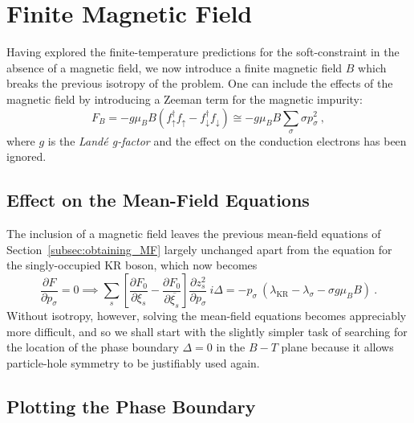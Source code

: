 
\section{Finite Magnetic Field}
\label{sec:finite_field}

Having explored the finite-temperature predictions for the soft-constraint in the absence of a magnetic field, we now introduce a finite magnetic field $ B $ which breaks the previous isotropy of the problem. One can include the effects of the magnetic field by introducing a Zeeman term for the magnetic impurity: $$ F_{B} = - g \mu_{B} B \left( f^{\dagger}_{\uparrow} f^{}_{\uparrow} - f^{\dagger}_{\downarrow} f^{}_{\downarrow} \right) \cong - g \mu_{B} B \sum_{\sigma} \sigma p^2_{\sigma} ~ , $$ where $ g $ is the \textit{Land\'{e} g-factor} and the effect on the conduction electrons has been ignored.

\subsection{Effect on the Mean-Field Equations}

The inclusion of a magnetic field leaves the previous mean-field equations of Section~\ref{subsec:obtaining_MF} largely unchanged apart from the equation for the singly-occupied KR boson, which now becomes
\begin{equation}
\frac{\partial F}{\partial p_{\sigma}} = 0 \implies \sum_{s} \left[ \frac{\partial F_{0}}{\partial \xi_{s}} - \frac{\partial F_{0}}{\partial \overline{\xi_{s}}} \right] \frac{\partial z^2_{s}}{\partial p_{\sigma}} ~ i \Delta = - p_{\sigma} ~ (\lambda_{\text{KR}} - \lambda_{\sigma} - \sigma g \mu_{B} B) ~ .
\end{equation}
Without isotropy, however, solving the mean-field equations becomes appreciably more difficult, and so we shall start with the slightly simpler task of searching for the location of the phase boundary $ \Delta = 0 $ in the $ B-T $ plane because it allows particle-hole symmetry to be justifiably used again.

\subsection{Plotting the Phase Boundary}

